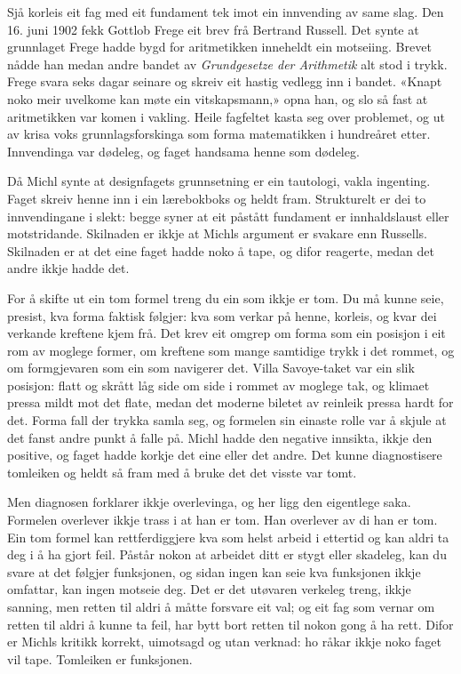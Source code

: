 Sjå korleis eit fag med eit fundament tek imot ein innvending av same slag. Den 16. juni 1902 fekk Gottlob Frege eit brev frå Bertrand Russell. Det synte at grunnlaget Frege hadde bygd for aritmetikken inneheldt ein motseiing. Brevet nådde han medan andre bandet av \emph{Grundgesetze der Arithmetik} alt stod i trykk. Frege svara seks dagar seinare og skreiv eit hastig vedlegg inn i bandet. «Knapt noko meir uvelkome kan møte ein vitskapsmann,» opna han, og slo så fast at aritmetikken var komen i vakling. Heile fagfeltet kasta seg over problemet, og ut av krisa voks grunnlagsforskinga som forma matematikken i hundreåret etter. Innvendinga var dødeleg, og faget handsama henne som dødeleg.

Då Michl synte at designfagets grunnsetning er ein tautologi, vakla ingenting. Faget skreiv henne inn i ein lærebokboks og heldt fram. Strukturelt er dei to innvendingane i slekt: begge syner at eit påstått fundament er innhaldslaust eller motstridande. Skilnaden er ikkje at Michls argument er svakare enn Russells. Skilnaden er at det eine faget hadde noko å tape, og difor reagerte, medan det andre ikkje hadde det.

For å skifte ut ein tom formel treng du ein som ikkje er tom. Du må kunne seie, presist, kva forma faktisk følgjer: kva som verkar på henne, korleis, og kvar dei verkande kreftene kjem frå. Det krev eit omgrep om forma som ein posisjon i eit rom av moglege former, om kreftene som mange samtidige trykk i det rommet, og om formgjevaren som ein som navigerer det. Villa Savoye-taket var ein slik posisjon: flatt og skrått låg side om side i rommet av moglege tak, og klimaet pressa mildt mot det flate, medan det moderne biletet av reinleik pressa hardt for det. Forma fall der trykka samla seg, og formelen sin einaste rolle var å skjule at det fanst andre punkt å falle på. Michl hadde den negative innsikta, ikkje den positive, og faget hadde korkje det eine eller det andre. Det kunne diagnostisere tomleiken og heldt så fram med å bruke det det visste var tomt.

Men diagnosen forklarer ikkje overlevinga, og her ligg den eigentlege saka. Formelen overlever ikkje trass i at han er tom. Han overlever av di han er tom. Ein tom formel kan rettferdiggjere kva som helst arbeid i ettertid og kan aldri ta deg i å ha gjort feil. Påstår nokon at arbeidet ditt er stygt eller skadeleg, kan du svare at det følgjer funksjonen, og sidan ingen kan seie kva funksjonen ikkje omfattar, kan ingen motseie deg. Det er det utøvaren verkeleg treng, ikkje sanning, men retten til aldri å måtte forsvare eit val; og eit fag som vernar om retten til aldri å kunne ta feil, har bytt bort retten til nokon gong å ha rett. Difor er Michls kritikk korrekt, uimotsagd og utan verknad: ho råkar ikkje noko faget vil tape. Tomleiken er funksjonen.

